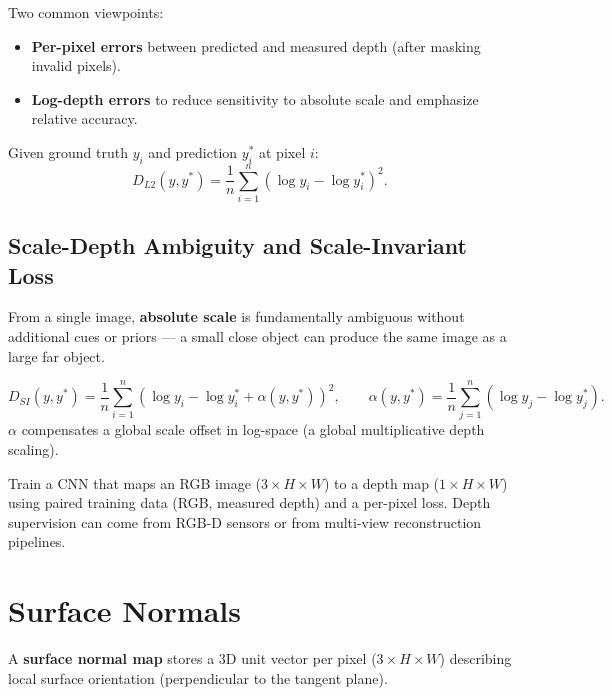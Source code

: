 \documentclass[11pt, oneside]{book}
\begin{document}
\begin{thmbox}[title={Reprojection Error Minimization}]
\begin{defbox}[title={Correlation and Convolution}]
\begin{defbox}[title={ReLU and Pooling}]
\begin{defbox}[title={Segmentation}]
\begin{defbox}[title={Graph-Based Segmentation}]
\begin{defbox}[title={U-Net}]
\begin{defbox}[title={AP and mAP}]
\begin{defbox}[title={Sparse vs.\ Dense Stereo}]
\begin{defbox}[title={SfM Pipeline}]
\begin{defbox}[title={Depth from X}]
Two common viewpoints:
\begin{itemize}
  \item \textbf{Per-pixel errors} between predicted and measured depth (after masking invalid pixels).
  \item \textbf{Log-depth errors} to reduce sensitivity to absolute scale and emphasize relative accuracy.
\end{itemize}

\begin{thmbox}[title={Per-Pixel Log-Depth Loss}]
Given ground truth $y_i$ and prediction $y_i^\ast$ at pixel $i$:
\[
D_{L2}(y,y^\ast) = \frac{1}{n}\sum_{i=1}^{n}\left(\log y_i - \log y_i^\ast\right)^2.
\]
\end{thmbox}

\subsection{Scale-Depth Ambiguity and Scale-Invariant Loss}

From a single image, \textbf{absolute scale} is fundamentally ambiguous without additional cues or priors ---
a small close object can produce the same image as a large far object.

\begin{thmbox}[title={Scale-Invariant Loss}]
\[
D_{SI}(y,y^\ast)=\frac{1}{n}\sum_{i=1}^{n}\left(\log y_i - \log y_i^\ast + \alpha(y,y^\ast)\right)^2,
\qquad
\alpha(y,y^\ast)=\frac{1}{n}\sum_{j=1}^{n}\left(\log y_j - \log y_j^\ast\right).
\]
$\alpha$ compensates a global scale offset in log-space (a global multiplicative depth scaling).
\end{thmbox}

\begin{defbox}[title={Monocular Depth Learning}]
Train a CNN that maps an RGB image ($3\times H\times W$) to a depth map ($1\times H\times W$) using paired training data
(RGB, measured depth) and a per-pixel loss.
Depth supervision can come from RGB-D sensors or from multi-view reconstruction pipelines.
\end{defbox}

\section{Surface Normals}

\begin{defbox}[title={Surface Normal Map}]
A \textbf{surface normal map} stores a 3D unit vector per pixel ($3\times H\times W$) describing local surface orientation
(perpendicular to the tangent plane).
\end{defbox}


\end{defbox}
\end{defbox}
\end{defbox}
\end{defbox}
\end{defbox}
\end{defbox}
\end{defbox}
\end{defbox}
\end{defbox}
\end{thmbox}
\end{document}

